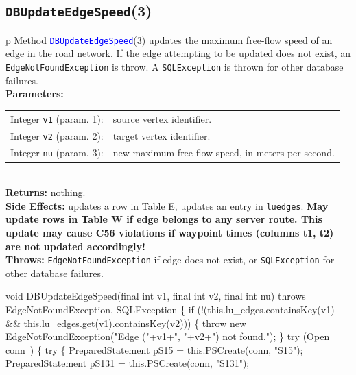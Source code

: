 \subsection{\texttt{DBUpdateEdgeSpeed}(3)}
\begin{tabular}{p{\textwidth}}
\toprule
{}
Method \textcolor{blue}{{\tt{}\protect{}DBUpdateEdgeSpeed}}(3) updates the maximum free-flow
speed of an edge in the road network. If the edge attempting to be updated
does not exist, an {\tt{}EdgeNotFoundException} is throw.
A {\tt{}SQLException} is thrown for other database failures.\\
\midrule
\textbf{Parameters:} \\
\begin{tabular}{lp{116mm}}
Integer {\tt{}v1} (param. 1):&source vertex identifier.\\
Integer {\tt{}v2} (param. 2):&target vertex identifier.\\
Integer {\tt{}nu} (param. 3):&new maximum free-flow speed, in meters per second.
\end{tabular}\\
\textbf{Returns:} nothing.\\
\textbf{Side Effects:} updates a row in Table E, updates an entry in
{\tt{}lu{}edges}. \textbf{May update rows in Table W if edge belongs to
any server route. This update may cause C56 violations if waypoint times
(columns \textsf{t1}, \textsf{t2}) are not updated accordingly!}\\
\textbf{Throws:} {\tt{}EdgeNotFoundException} if edge does not exist,
or {\tt{}SQLException} for other database failures.\\
\bottomrule
\end{tabular}
\nwenddocs{}\endmoddef{}
void DBUpdateEdgeSpeed(final int v1, final int v2, final int nu)
throws EdgeNotFoundException, SQLException \{
  if (!(this.lu_edges.containsKey(v1) && this.lu_edges.get(v1).containsKey(v2))) \{
    throw new EdgeNotFoundException("Edge ("+v1+", "+v2+") not found.");
  \}
  try (\LA{}Open \code{}conn\edoc{}~{\nwtagstyle{}}\RA{}) \{
    try \{
      PreparedStatement pS15 = this.PSCreate(conn, "S15");
      PreparedStatement pS131 = this.PSCreate(conn, "S131");
